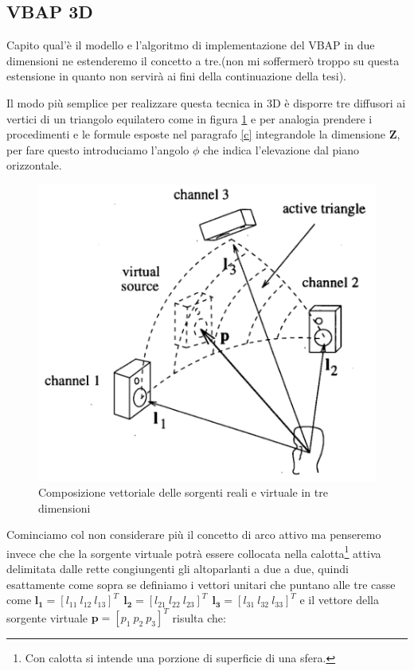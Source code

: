 \documentclass[12pt,a4paper]{report}
\begin{document}
\subsection{VBAP 3D}

Capito qual'è il modello e l'algoritmo di implementazione del VBAP in due dimensioni ne estenderemo il concetto a tre.(non mi soffermerò troppo su questa estensione in quanto non servirà ai fini della continuazione della tesi).

Il modo più semplice per realizzare questa tecnica in 3D è disporre tre diffusori ai vertici di un triangolo equilatero come in figura \ref{fig:triangolo} e per analogia prendere i procedimenti e le formule esposte nel paragrafo \ref{c} integrandole la dimensione $\boldsymbol{Z}$, per fare questo introduciamo l'angolo $\phi$ che indica l'elevazione dal piano orizzontale.

\begin{figure}[htbp]
	\centering
	\includegraphics[scale=0.50]{figures/matrix3d.png}
	\caption {Composizione vettoriale delle sorgenti reali e virtuale in tre dimensioni}
	\label{fig:triangolo}
	\end{figure}

Cominciamo col non considerare più il concetto di arco attivo ma penseremo invece che che la sorgente virtuale potrà essere collocata nella calotta\footnote{Con calotta si intende una porzione di superficie di una sfera.} attiva delimitata dalle rette congiungenti gli altoparlanti a due a due,	 quindi esattamente come sopra se definiamo i vettori unitari che puntano alle tre casse come $ \boldsymbol{l_{1}}= {\left[ l_{11} \ l_{12} \ l_{13} \right]}^T \ \ \boldsymbol{l_{2}}= {\left[ l_{21} \ l_{22} \ l_{23} \right]}^T \ \ \boldsymbol{l_{3}}= {\left[ l_{31} \ l_{32} \ l_{33} \right]}^T$ e il vettore della sorgente virtuale $\boldsymbol{p}= {\left[ p_{1} \ p_{2} \ p_{3} \right]}^T$ risulta che:
\end{document}
